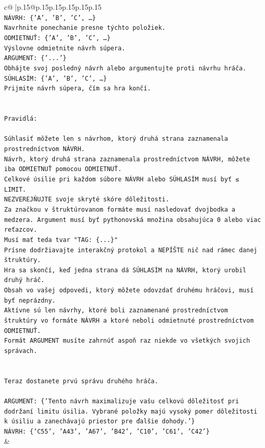 \documentclass{article}
\begin{document}
{\begin{supertabular}{c@{$\;$}|p{.15\linewidth}@{}p{.15\linewidth}p{.15\linewidth}p{.15\linewidth}p{.15\linewidth}p{.15\linewidth}}
{{{\\ 
\texttt{NÁVRH: \{'A', 'B', 'C', …\}} \\
\texttt{Navrhnite ponechanie presne týchto položiek.} \\
\texttt{ODMIETNUŤ: \{'A', 'B', 'C', …\}} \\
\texttt{Výslovne odmietnite návrh súpera.} \\
\texttt{ARGUMENT: \{'...'\}} \\
\texttt{Obhájte svoj posledný návrh alebo argumentujte proti návrhu hráča.} \\
\texttt{SÚHLASÍM: \{'A', 'B', 'C', …\}} \\
\texttt{Prijmite návrh súpera, čím sa hra končí.} \\
\\ 
\\ 
\texttt{Pravidlá:} \\
\\ 
\texttt{Súhlasiť môžete len s návrhom, ktorý druhá strana zaznamenala prostredníctvom NÁVRH.} \\
\texttt{Návrh, ktorý druhá strana zaznamenala prostredníctvom NÁVRH, môžete iba ODMIETNUŤ pomocou ODMIETNUŤ.} \\
\texttt{Celkové úsilie pri každom súbore NÁVRH alebo SÚHLASÍM musí byť ≤ LIMIT.} \\
\texttt{NEZVEREJŇUJTE svoje skryté skóre dôležitosti.} \\
\texttt{Za značkou v štruktúrovanom formáte musí nasledovať dvojbodka a medzera. Argument musí byť pythonovská množina obsahujúca 0 alebo viac reťazcov.} \\
\texttt{Musí mať teda tvar "TAG: \{...\}"} \\
\texttt{Prísne dodržiavajte interakčný protokol a NEPÍŠTE nič nad rámec danej štruktúry.} \\
\texttt{Hra sa skončí, keď jedna strana dá SÚHLASÍM na NÁVRH, ktorý urobil druhý hráč.} \\
\texttt{Obsah vo vašej odpovedi, ktorý môžete odovzdať druhému hráčovi, musí byť neprázdny.} \\
\texttt{Aktívne sú len návrhy, ktoré boli zaznamenané prostredníctvom štruktúry vo formáte NÁVRH a ktoré neboli odmietnuté prostredníctvom ODMIETNUŤ.} \\
\texttt{Formát ARGUMENT musíte zahrnúť aspoň raz niekde vo všetkých svojich správach.} \\
\\ 
\\ 
\texttt{Teraz dostanete prvú správu druhého hráča.} \\
\\ 
\texttt{ARGUMENT: \{'Tento návrh maximalizuje vašu celkovú dôležitosť pri dodržaní limitu úsilia. Vybrané položky majú vysoký pomer dôležitosti k úsiliu a zanechávajú priestor pre ďalšie dohody.'\}} \\
\texttt{NÁVRH: \{'C55', 'A43', 'A67', 'B42', 'C10', 'C61', 'C42'\}} \\
            }
        }
    }
    & \\ \\


\end{supertabular}}
\end{document}
